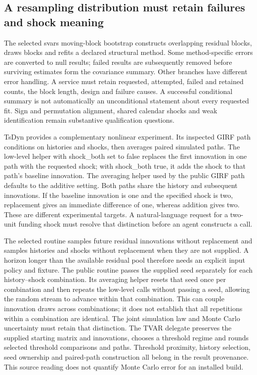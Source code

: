 \subsection{A resampling distribution must retain failures and shock meaning}

The selected svars moving-block bootstrap constructs overlapping residual blocks, draws blocks and refits a declared structural method. Some method-specific errors are converted to null results; failed results are subsequently removed before surviving estimates form the covariance summary. Other branches have different error handling. A service must retain requested, attempted, failed and retained counts, the block length, design and failure causes. A successful conditional summary is not automatically an unconditional statement about every requested fit. Sign and permutation alignment, shared calendar shocks and weak identification remain substantive qualification questions.\citep{exec25_rdyn_svars}

TsDyn provides a complementary nonlinear experiment. Its inspected GIRF path conditions on histories and shocks, then averages paired simulated paths. The low-level helper with shock\_both set to false replaces the first innovation in one path with the requested shock; with shock\_both true, it adds the shock to that path's baseline innovation. The averaging helper used by the public GIRF path defaults to the additive setting. Both paths share the history and subsequent innovations. If the baseline innovation is one and the specified shock is two, replacement gives an immediate difference of one, whereas addition gives two. These are different experimental targets. A natural-language request for a two-unit funding shock must resolve that distinction before an agent constructs a call.\citep{exec25_rdyn_tsdyn,exec25_rdyn_choice}

The selected routine samples future residual innovations without replacement and samples histories and shocks without replacement when they are not supplied. A horizon longer than the available residual pool therefore needs an explicit input policy and fixture. The public routine passes the supplied seed separately for each history--shock combination. Its averaging helper resets that seed once per combination and then repeats the low-level calls without passing a seed, allowing the random stream to advance within that combination. This can couple innovation draws across combinations; it does not establish that all repetitions within a combination are identical. The joint simulation law and Monte Carlo uncertainty must retain that distinction. The TVAR delegate preserves the supplied starting matrix and innovations, chooses a threshold regime and rounds selected threshold comparisons and paths. Threshold proximity, history selection, seed ownership and paired-path construction all belong in the result provenance. This source reading does not quantify Monte Carlo error for an installed build.\citep{exec25_rdyn_tsdyn}

